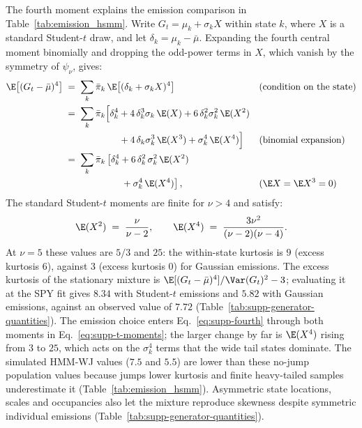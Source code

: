 The fourth moment explains the emission comparison in
Table~\ref{tab:emission_hsmm}. Write $G_t = \mu_k +
\sigma_k X$ within state $k$, where $X$ is a standard Student-$t$
draw, and let $\delta_k = \mu_k - \bar\mu$. Expanding the fourth
central moment binomially and dropping the odd-power terms in $X$,
which vanish by the symmetry of $\psi_\nu$, gives:
\begin{align}
  \E\big[(G_t - \bar\mu)^4\big]
   &\;=\; \sum_k \bar\pi_k\,
     \E\big[(\delta_k + \sigma_k X)^4\big]
     && \text{(condition on the state)} \notag \\
   &\;=\; \sum_k \bar\pi_k \Big[
     \delta_k^4 + 4\, \delta_k^3 \sigma_k\, \E(X)
     + 6\, \delta_k^2 \sigma_k^2\, \E(X^2) \notag \\
   &\hspace{6em}
     + 4\, \delta_k \sigma_k^3\, \E(X^3) + \sigma_k^4\, \E(X^4)\Big]
     && \text{(binomial expansion)} \notag \\
   &\;=\; \sum_k \bar\pi_k \left[
     \delta_k^4
     + 6\, \delta_k^2\, \sigma_k^2\, \E(X^2)\right. \notag \\
   &\hspace{6em}\left.{}
     + \sigma_k^4\, \E(X^4)
     \right],
     && \text{($\E X = \E X^3 = 0$)}
  \label{eq:supp-fourth}
\end{align}
The standard Student-$t$ moments are finite for $\nu > 4$ and satisfy:
\begin{equation}
  \E(X^2) \;=\; \frac{\nu}{\nu - 2},
  \qquad
  \E(X^4) \;=\; \frac{3 \nu^2}{(\nu - 2)(\nu - 4)}.
  \label{eq:supp-t-moments}
\end{equation}
At $\nu = 5$ these values are $5/3$ and $25$: the within-state
kurtosis is $9$ (excess kurtosis $6$), against $3$ (excess kurtosis
$0$) for Gaussian emissions. The excess kurtosis of the stationary mixture is
$\E[(G_t - \bar\mu)^4] / \Var(G_t)^2 - 3$; evaluating it at the SPY
fit gives $8.34$ with Student-$t$ emissions and $5.82$ with Gaussian
emissions, against an observed value of $7.72$
(Table~\ref{tab:supp-generator-quantities}). The emission choice enters
Eq.~\eqref{eq:supp-fourth} through both moments in
Eq.~\eqref{eq:supp-t-moments}; the larger change by far is
$\E(X^4)$ rising from $3$ to $25$, which acts on the $\sigma_k^4$
terms that the wide tail states dominate. The simulated HMM-WJ values ($7.5$ and $5.5$) are lower than these no-jump population values because jumps lower kurtosis and finite heavy-tailed samples underestimate it (Table~\ref{tab:emission_hsmm}). Asymmetric state locations, scales and occupancies also let the mixture reproduce skewness despite symmetric individual emissions (Table~\ref{tab:supp-generator-quantities}).

